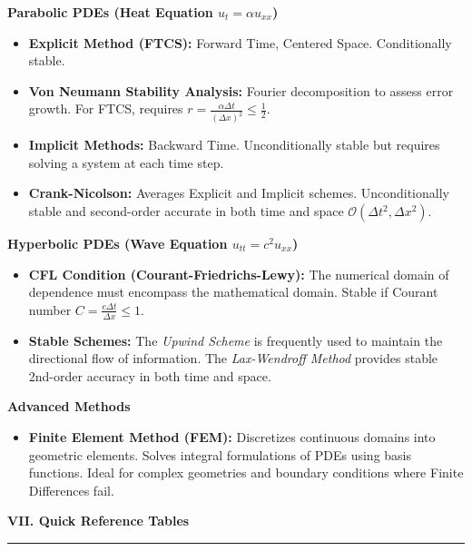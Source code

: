 \documentclass[10pt, landscape, twocolumn]{article}
\newcommand{\cheatsheetsection}[1]{
    \vspace{0.6em}
    {\color{themeblue}\large\bfseries #1} \par
    \vspace{-0.5em}
    {\color{themeblue}\rule{\linewidth}{1pt}} \par
    \vspace{0.2em}
}
\newcommand{\cheatsheetsubsection}[1]{
    \vspace{0.4em}
    {\color{themeblue}\normalsize\bfseries #1} \par
    \vspace{0.1em}
}
\begin{document}
\cheatsheetsubsection{Parabolic PDEs (Heat Equation $u_t = \alpha u_{xx}$)}
\begin{itemize}[leftmargin=*, nosep]
    \item \textbf{Explicit Method (FTCS):} Forward Time, Centered Space. Conditionally stable.
    \item \textbf{Von Neumann Stability Analysis:} Fourier decomposition to assess error growth. For FTCS, requires $r = \frac{\alpha \Delta t}{(\Delta x)^2} \leq \frac{1}{2}$.
    \item \textbf{Implicit Methods:} Backward Time. Unconditionally stable but requires solving a system at each time step.
    \item \textbf{Crank-Nicolson:} Averages Explicit and Implicit schemes. Unconditionally stable and second-order accurate in both time and space $\mathcal{O}(\Delta t^2, \Delta x^2)$.
\end{itemize}

\cheatsheetsubsection{Hyperbolic PDEs (Wave Equation $u_{tt} = c^2 u_{xx}$)}
\begin{itemize}[leftmargin=*, nosep]
    \item \textbf{CFL Condition (Courant-Friedrichs-Lewy):} The numerical domain of dependence must encompass the mathematical domain. Stable if Courant number $C = \frac{c \Delta t}{\Delta x} \leq 1$.
    \item \textbf{Stable Schemes:} The \textit{Upwind Scheme} is frequently used to maintain the directional flow of information. The \textit{Lax-Wendroff Method} provides stable 2nd-order accuracy in both time and space.
\end{itemize}

\cheatsheetsubsection{Advanced Methods}
\begin{itemize}[leftmargin=*, nosep]
    \item \textbf{Finite Element Method (FEM):} Discretizes continuous domains into geometric elements. Solves integral formulations of PDEs using basis functions. Ideal for complex geometries and boundary conditions where Finite Differences fail.
\end{itemize}

\onecolumn
\raggedbottom

\cheatsheetsection{\LARGE VII. Quick Reference Tables}
\vspace{1em}
\end{document}
